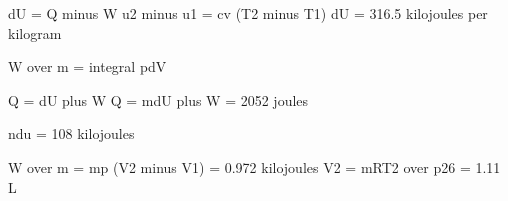 dU = Q minus W  
u2 minus u1 = cv (T2 minus T1)  
dU = 316.5 kilojoules per kilogram  

W over m = integral pdV  

Q = dU plus W  
Q = mdU plus W = 2052 joules  

ndu = 108 kilojoules  

W over m = mp (V2 minus V1) = 0.972 kilojoules  
V2 = mRT2 over p26 = 1.11 L